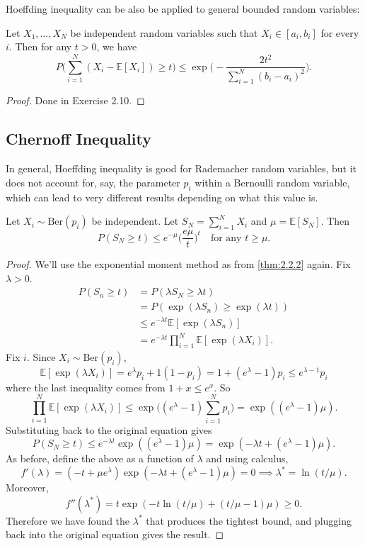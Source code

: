 Hoeffding inequality can be also be applied to general bounded random variables: 
\begin{theorem}
Let $X_1, \dots, X_N$ be independent random variables such that $X_i \in [a_i, b_i]$ for every $i$. Then 
for any $t > 0$, we have 
\[ P \biggl( \sum_{i = 1}^{N} (X_i - \mathbb{E}[X_i]) \geq t \biggr) 
\leq \exp{\biggl( -\frac{2t^2}{\sum_{i = 1}^{N} (b_i - a_i)^2} \biggr)}. \]
\end{theorem}

\begin{proof}
Done in Exercise 2.10.
\end{proof}


\subsection{Chernoff Inequality}
In general, Hoeffding inequality is good for Rademacher random variables, but it does not account for, say, 
the parameter $p_i$ within a Bernoulli random variable, which can lead to very different results depending 
on what this value is.

\begin{theorem}
\label{thm:2.3.1}
Let $X_i \sim \text{Ber}(p_i)$ be independent. Let $S_N = \sum_{i = 1}^{N} X_i$ and $\mu = \mathbb{E}[S_N]$. 
Then 
\[ P(S_N \geq t) \leq e^{-\mu} \biggl( \frac{e \mu}{t} \biggr)^t \quad \text{for any } t \geq \mu. \]
\end{theorem}

\begin{proof}
We'll use the exponential moment method as from \cref{thm:2.2.2} again. Fix $\lambda > 0$.
\begin{align*}
	P(S_n \geq t) 
	&= P(\lambda S_N \geq \lambda t) \\
	&= P(\exp{(\lambda S_n)} \geq \exp{(\lambda t)}) \\
	&\leq e^{-\lambda t} \mathbb{E}[\exp{(\lambda S_n)}] \\
	&= e^{-\lambda t} \prod_{i = 1}^{N} \mathbb{E}[\exp{(\lambda X_i)}]. 
\end{align*}
Fix $i$. Since $X_i \sim \text{Ber}(p_i)$, 
\[ \mathbb{E}[\exp{(\lambda X_i)}] = e^{\lambda} p_i + 1(1 - p_i) 
= 1 + (e^\lambda - 1)p_i \leq e^{\lambda - 1} p_i \]
where the last inequality comes from $1 + x \leq e^x$. So 
\[ \prod_{i = 1}^{N} \mathbb{E}[\exp{(\lambda X_i)}] \leq \exp{ \biggl( 
(e^\lambda - 1) \sum_{i = 1}^{N} p_i \biggr)} = \exp{((e^\lambda - 1)\mu)}. \]
Substituting back to the original equation gives 
\[ P(S_N \geq t) \leq e^{-\lambda t} \exp{((e^\lambda - 1)\mu)} 
= \exp{(-\lambda t + (e^\lambda - 1)\mu)}. \]
As before, define the above as a function of $\lambda$ and using calculus, 
\[ f'(\lambda) = (-t + \mu e^\lambda)\exp{(-\lambda t + (e^\lambda - 1)\mu)} = 0 
\implies \lambda^* = \ln{(t / \mu)}. \]
Moreover, 
\[ f''(\lambda^*) = t\exp{(-t \ln{(t / \mu)} + (t / \mu - 1)\mu)} \geq 0. \]
Therefore we have found the $\lambda^*$ that produces the tightest bound, and plugging back into the 
original equation gives the result.
\end{proof}

